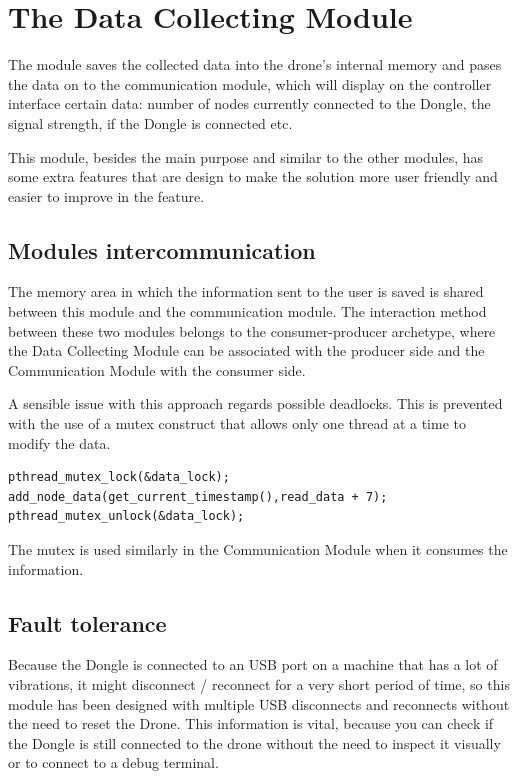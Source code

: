 \section{The Data Collecting Module}

The module saves the collected data into the drone's internal memory and pases the data on to the communication module, which will display on the controller interface certain data: number of nodes currently connected to the Dongle, the signal strength, if the Dongle is connected etc.

This module, besides the main purpose and similar to the other modules, has some extra features that are design to make the solution more user friendly and easier to improve in the feature.

\subsection{Modules intercommunication}

The memory area in which the information sent to the user is saved is shared between this module and the communication module. The interaction method between these two modules belongs to the consumer-producer archetype, where the Data Collecting Module can be associated with the producer side and the Communication Module with the consumer side.

A sensible issue with this approach regards possible deadlocks. This is prevented with the use of a mutex construct that allows only one thread at a time to modify the data.

\lstset{numbers=none, mathescape=true, nolol=false,caption=Data Collection use of mutex,label=lst:task}
\begin{lstlisting}
pthread_mutex_lock(&data_lock);
add_node_data(get_current_timestamp(),read_data + 7);
pthread_mutex_unlock(&data_lock);
\end{lstlisting}

The mutex is used similarly in the Communication Module when it consumes the information.


\subsection{Fault tolerance}

Because the Dongle is connected to an USB port on a machine that has a lot of vibrations, it might disconnect / reconnect for a very short period of time, so this module has been designed  with multiple USB disconnects and reconnects without the need to reset the Drone. This information is vital, because you can check if the Dongle is still connected to the drone without the need to inspect it visually or to connect to a debug terminal.


